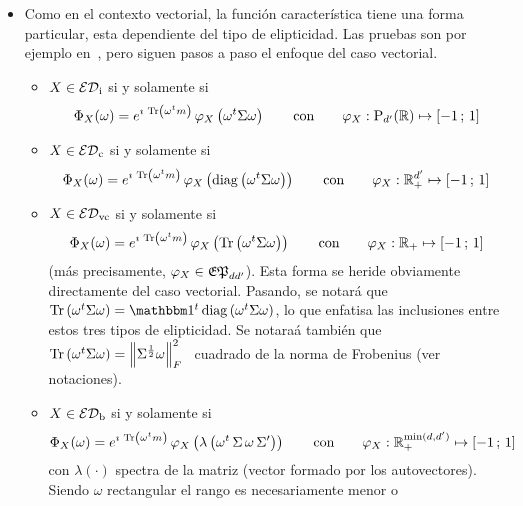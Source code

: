 \begin{itemize}
%
\item Como  en el  contexto vectorial, la  funci\'on caracter\'istica  tiene una
  forma particular,  esta dependiente del  tipo de elipticidad. Las  pruebas son
  por ejemplo  en~\cite{FanChe84, JenGoo81, GupNag99}, pero siguen  pasos a paso
  el enfoque del caso vectorial.
  \begin{itemize}
  \item $X \in \mathcal{ED}_{\mathrm{i}}$  si y solamente si
  \[
  \Phi_X(\omega) = e^{\imath \, \operatorname{Tr}\left( \omega^t m \right)} \, \varphi_X\left(
    \omega^t   \Sigma  \omega  \right)   \qquad  \mbox{con}   \qquad  \varphi_X:
  \mathrm{P}_{d'}(\mathbb{R}) \mapsto [-1 \, ; \, 1]
  \]
  \item  $X \in \mathcal{ED}_{\mathrm{c}}$ si y solamente si
  \[
  \Phi_X(\omega) = e^{\imath \, \operatorname{Tr}\left( \omega^t m \right)} \, \varphi_X\left(
    \operatorname{diag}\left( \omega^t \Sigma \omega  \right) \right) \qquad \mbox{con} \qquad
  \varphi_X: \mathbb{R}_+^{d'} \mapsto [-1 \, ; \, 1]
  \]
  \item  $X \in \mathcal{ED}_{\mathrm{vc}}$ si y solamente si
  \[
  \Phi_X(\omega) = e^{\imath \, \operatorname{Tr}\left( \omega^t m \right)} \, \varphi_X\left(
    \operatorname{Tr}\left( \omega^t  \Sigma \omega  \right) \right) \qquad  \mbox{con} \qquad
  \varphi_X: \mathbb{R}_+ \mapsto [-1 \, ; \, 1]
  \]
  (m\'as  precisamente, $\varphi_X  \in \mathfrak{EP}_{d  d'}$).  Esta  forma  se heride
  obviamente  directamente  del  caso   vectorial.   Pasando,  se  notar\'a  que
  $\Tr\left( \omega^t \Sigma \omega  \right) = \un^t \diag\left( \omega^t \Sigma
    \omega \right)$, lo  que enfatisa las inclusiones entre  estos tres tipos de
  elipticidad. Se  notara\'a tambi\'en que  \ $\operatorname{Tr}\left( \omega^t  \Sigma \omega
  \right) = \left\| \Sigma^{\frac12} \omega \right\|_F^2$ \ cuadrado de la norma
  de Frobenius (ver notaciones).
  \item $X \in \mathcal{ED}_{\mathrm{b}}$  si y solamente si
  \[
  \Phi_X(\omega) = e^{\imath \, \operatorname{Tr}\left( \omega^t m \right)} \, \varphi_X\left(
    \lambda\left( \omega^t \, \Sigma \, \omega \, \Sigma' \right) \right) \qquad
  \mbox{con} \qquad \varphi_X: \mathbb{R}_+^{\min(d,d')} \mapsto [-1 \, ; \, 1]
  \]
  con   $\lambda(\cdot)$  spectra  de   la  matriz   (vector  formado   por  los
  autovectores). Siendo $\omega$ rectangular  el rango es necesariamente menor o

\end{itemize}
\end{itemize}
